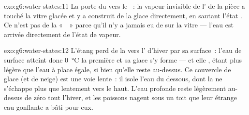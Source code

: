 \begin{solution}{exo:g6:water-states:11}
La porte du  vers le ~: la vapeur invisible de l' de la
pièce a touché la vitre glacée et y a construit de la glace
directement, en sautant l'état . Ce n'est pas de la
«~~» parce qu'il n'y a jamais eu de  sur la
vitre --- l'eau est arrivée directement de l'état de vapeur.
\end{solution}

\begin{solution}{exo:g6:water-states:12}
L'étang perd de la  vers l' d'hiver par sa surface~: l'eau
de surface atteint donc \qty{0}{\celsius} la première et sa glace s'y
forme --- et elle , étant plus légère que l'eau à place égale,
si bien qu'elle reste au-dessus. Ce couvercle de glace (et de neige)
est une voie lente~: il isole l'eau du dessous, dont la  ne
s'échappe plus que lentement vers le haut. L'eau profonde reste
légèrement au-dessus de zéro tout l'hiver, et les poissons nagent
sous un toit que leur étrange eau gonflante a bâti pour eux.
\end{solution}

